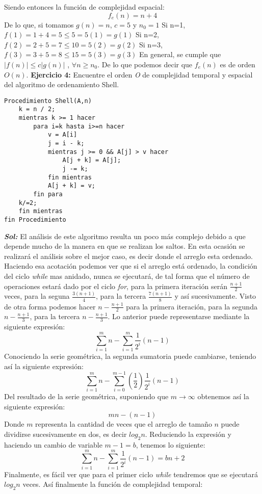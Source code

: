 \documentclass[12pt, letterpaper, twoside]{article}
\begin{document}
Siendo entonces la función de complejidad espacial:
\[f_{e}(n)=n+4\]
De lo que, si tomamos $g(n)=n$, $c=5$ y $n_{0}=1$
\newline
Si n=1,
\center$f(1)=1+4=5\leq 5=5(1)=g(1)$
\justify
Si n=2,
\center$f(2)=2+5=7\leq 10=5(2)=g(2)$
\justify
Si n=3,
\center$f(3)=3+5=8\leq 15=5(3)=g(3)$
\justify
En general, se cumple que
\center$|f(n)|\leq c|g(n)|$ , $\forall n\geq n_{0}$.
\justify
De lo que podemos decir que $f_{e}(n)$ es de orden $O(n)$.
\newpage
\textbf{Ejercicio 4:} Encuentre el orden \textit{O} de complejidad temporal y espacial del algoritmo de ordenamiento Shell.
\begin{lstlisting}
Procedimiento Shell(A,n)
	k = n / 2;
	mientras k >= 1 hacer
		para i=k hasta i>=n hacer
			v = A[i]
			j = i - k;
			mientras j >= 0 && A[j] > v hacer
				A[j + k] = A[j];
				j -= k;
			fin mientras
			A[j + k] = v;
		fin para
	k/=2;
	fin mientras
fin Procedimiento
\end{lstlisting}
\justify
\textbf{\textit{Sol:}}
El análisis de este algoritmo resulta un poco más complejo debido a que depende mucho de la manera en que se realizan los saltos. En esta ocasión se realizará el análisis sobre el mejor caso, es decir donde el arreglo esta ordenado.
\newline
Haciendo esa acotación podemos ver que si el arreglo está ordenado, la condición del ciclo \textit{while} mas anidado, nunca se ejecutará, de tal forma que el número de operaciones estará dado por el ciclo \textit{for}, para la primera iteración serán $\frac{n+1}{2}$ veces, para la seguna $\frac{3(n+1)}{4}$, para la tercera $\frac{7(n+1)}{8}$ y así sucesivamente. Visto de otra forma podemos hacer $n-\frac{n+1}{2}$ para la primera iteración, para la segunda $n-\frac{n+1}{3}$, para la tercera $n-\frac{n+1}{3}$. Lo anterior puede representarse mediante la siguiente expresión:
\[\sum_{i=1}^{m}n-\sum_{i=1}^{m}\frac{1}{2^{i}}(n-1)\]
Conociendo la serie geométrica, la segunda sumatoria puede cambiarse, teniendo así la siguiente expresión:
\[\sum_{i=1}^{m}n-\sum_{i=0}^{m-1}(\frac{1}{2})\frac{1}{2^{i}}(n-1)\]
Del resultado de la serie geométrica, suponiendo que $m\to\infty$ obtenemos así la siguiente expresión:
\[ mn - (n-1) \]
Donde $m$ representa la cantidad de veces que el arreglo de tamaño $n$ puede dividirse sucesivamente en dos, es decir $log_{2}n$.
\newline
Reduciendo la expresión y haciendo un cambio de variable $m-1=b$, tenemos lo siguiente:
\[ \sum_{i=1}^{m}n-\sum_{i=1}^{m}\frac{1}{2^{i}}(n-1) = bn + 2 \]
Finalmente, es fácil ver que para el primer ciclo \textit{while} tendremos que se ejecutará $log_{2}n$ veces. Así finalmente la función de complejidad temporal:
\end{document}
